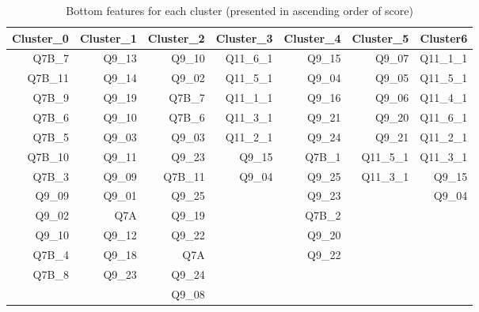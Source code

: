 \documentclass{article}
\begin{document}
\begin{table}[htbp]
  \centering
  \caption{Bottom features for each cluster (presented in ascending order of
  score)}
    \begin{tabular}{rrrrrrr}
    \toprule
    Cluster\_0 & Cluster\_1 & Cluster\_2 & Cluster\_3 & Cluster\_4 & Cluster\_5 & Cluster6 \\
    \midrule
    Q7B\_7 & Q9\_13 & Q9\_10 & Q11\_6\_1 & Q9\_15 & Q9\_07 & Q11\_1\_1 \\
    Q7B\_11 & Q9\_14 & Q9\_02 & Q11\_5\_1 & Q9\_04 & Q9\_05 & Q11\_5\_1 \\
    Q7B\_9 & Q9\_19 & Q7B\_7 & Q11\_1\_1 & Q9\_16 & Q9\_06 & Q11\_4\_1 \\
    Q7B\_6 & Q9\_10 & Q7B\_6 & Q11\_3\_1 & Q9\_21 & Q9\_20 & Q11\_6\_1 \\
    Q7B\_5 & Q9\_03 & Q9\_03 & Q11\_2\_1 & Q9\_24 & Q9\_21 & Q11\_2\_1 \\
    Q7B\_10 & Q9\_11 & Q9\_23 & Q9\_15 & Q7B\_1 & Q11\_5\_1 & Q11\_3\_1 \\
    Q7B\_3 & Q9\_09 & Q7B\_11 & Q9\_04 & Q9\_25 & Q11\_3\_1 & Q9\_15 \\
    Q9\_09 & Q9\_01 & Q9\_25 &       & Q9\_23 &       & Q9\_04 \\
    Q9\_02 & Q7A   & Q9\_19 &       & Q7B\_2 &       &  \\
    Q9\_10 & Q9\_12 & Q9\_22 &       & Q9\_20 &       &  \\
    Q7B\_4 & Q9\_18 & Q7A   &       & Q9\_22 &       &  \\
    Q7B\_8 & Q9\_23 & Q9\_24 &       &       &       &  \\
          &       & Q9\_08 &       &       &       &  \\
    \bottomrule
    \end{tabular}
  \label{tab:bottom}
\end{table}
\end{document}

